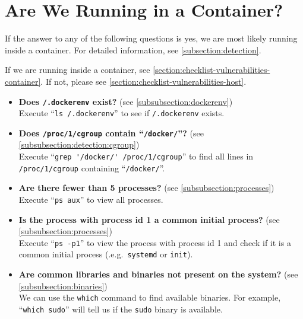 \section{Are We Running in a Container?}\label{section:checklist-detection}
If the answer to any of the following questions is yes, we are most likely running inside a container. For detailed information, see \autoref{subsection:detection}.

\medskip

If we are running inside a container, see \autoref{section:checklist-vulnerabilities-container}. If not, please see \autoref{section:checklist-vulnerabilities-host}.

\begin{itemize}
    \item \textbf{Does \lstinline{/.dockerenv} exist?} (see \autoref{subsubsection:dockerenv})\\
    Execute ``\lstinline{ls /.dockerenv}'' to see if \lstinline{/.dockerenv} exists.

    \item \textbf{Does \lstinline{/proc/1/cgroup} contain ``\lstinline{/docker/}''?} (see \autoref{subsubsection:detection:cgroup})\\
    Execute ``\lstinline{grep '/docker/' /proc/1/cgroup}'' to find all lines in \lstinline{/proc/1/cgroup} containing ``\lstinline{/docker/}''.

    \item \textbf{Are there fewer than 5 processes?} (see \autoref{subsubsection:processes})\\
    Execute ``\lstinline{ps aux}'' to view all processes.

    \item \textbf{Is the process with process id 1 a common initial process?} (see \autoref{subsubsection:processes})\\
    Execute ``\lstinline{ps -p1}'' to view the process with process id 1 and check if it is a common initial process (.e.g.\ \lstinline{systemd} or \lstinline{init}).

    \item \textbf{Are common libraries and binaries not present on the system?} (see \autoref{subsubsection:binaries})\\
    We can use the \lstinline{which} command to find available binaries. For example, ``\lstinline{which sudo}'' will tell us if the \lstinline{sudo} binary is available.
\end{itemize}
